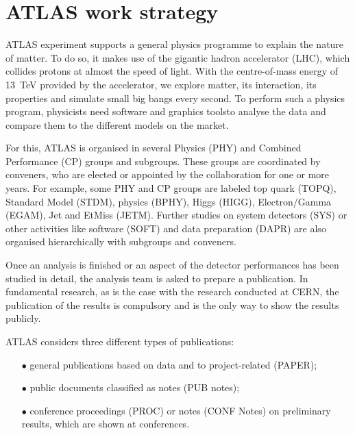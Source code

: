 
\section{ATLAS work strategy}%
\label{sec:ATLAS_work_strategy}


ATLAS experiment supports a  general physics programme to explain the nature of matter. To do so,  it makes use of the gigantic hadron accelerator (LHC), which collides protons at almost the speed of light. With the centre-of-mass energy of \SI{13}{\TeV} provided by the accelerator, we explore matter, its interaction, its properties and simulate small big bangs every second. To perform such a physics program, physicists need software and graphics toolsto analyse the data and compare them to the different models on the market.

For this, ATLAS is organised in several Physics (PHY) and  Combined Performance (CP) groups and subgroups. These groups are coordinated by conveners, who are elected or appointed by the collaboration for one or more years.
For example, some  PHY and CP groups are labeled top quark (TOPQ), Standard Model (STDM), \PB physics (BPHY), Higgs (HIGG), Electron/Gamma (EGAM), Jet and EtMiss (JETM).
Further studies on system detectors (SYS) or other activities like software (SOFT) and data preparation (DAPR) are also organised hierarchically with subgroups and conveners.

Once an analysis is finished or an aspect of the detector performances has been studied in detail,
the analysis team is asked to prepare a publication.
In fundamental research, as is the case with the research conducted at CERN, the publication of the results is  compulsory and is the only way to show the results publicly.

ATLAS considers three different types of publications:
\begin{itemize}
    \item[$\bullet$] general publications based on data and to project-related  (PAPER);
    \item[$\bullet$] public documents classified as notes (PUB notes);
    \item[$\bullet$] conference proceedings (PROC) or notes (CONF Notes) on preliminary results, which are shown at conferences.
\end{itemize}

